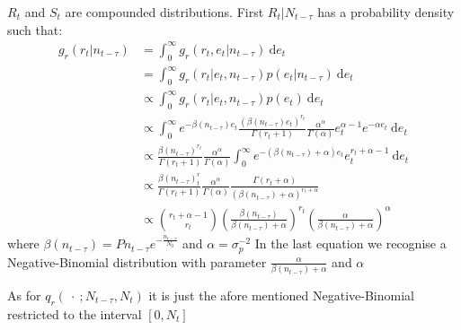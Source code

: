\documentclass{article}
\begin{document}
	$R_t$ and $S_t$ are compounded distributions.
	First $R_t | N_{t-\tau}$ has a probability density such that:
	\begin{equation*}
	\begin{split}
			g_r(r_t | n_{t-\tau}) & = \int_{0}^{\infty}g_r(r_t, e_t | n_{t-\tau})\ \mathrm{d}e_t \\
			& = \int_{0}^{\infty}g_r(r_t | e_t, n_{t-\tau})p(e_t | n_{t-\tau})\ \mathrm{d}e_t \\
			& \propto \int_{0}^{\infty}g_r(r_t | e_t, n_{t-\tau})p(e_t)\ \mathrm{d}e_t \\
			& \propto \int_{0}^{\infty}e^{-\beta(n_{t-\tau})e_t}\frac{(\beta(n_{t-\tau})e_t)^{r_t}}{\Gamma(r_t+1)}\frac{\alpha^\alpha}{\Gamma(\alpha)}e_t^{\alpha-1}e^{-\alpha e_t}\ \mathrm{d}e_t \\
			& \propto \frac{\beta(n_{t-\tau})^{r_t}}{\Gamma(r_t+1)}\frac{\alpha^\alpha}{\Gamma(\alpha)}\int_{0}^{\infty}e^{-(\beta(n_{t-\tau})+\alpha)e_t}e_t^{r_t+\alpha-1}\ \mathrm{d}e_t \\
			& \propto \frac{\beta(n_{t-\tau})^r_t}{\Gamma(r_t+1)}\frac{\alpha^\alpha}{\Gamma(\alpha)}\frac{\Gamma(r_t+\alpha)}{(\beta(n_{t-\tau})+\alpha)^{r_t+\alpha}} \\
			& \propto \binom{r_t + \alpha - 1}{r_t}(\frac{\beta(n_{t-\tau})}{\beta(n_{t-\tau}) + \alpha})^{r_t}(\frac{\alpha}{\beta(n_{t-\tau}) + \alpha})^\alpha
	\end{split}
	\end{equation*}
	where $\beta(n_{t-\tau}) = Pn_{t-\tau}e^{-\frac{n_{t-\tau}}{N_0}}$ and $\alpha = \sigma_p^{-2}$
	In the last equation we recognise a Negative-Binomial distribution with parameter $\frac{\alpha}{\beta(n_{t-\tau}) + \alpha}$ and $\alpha$
	
	As for $q_r(\ \cdot \ ; N_{t-\tau}, N_t)$ it is just the afore mentioned Negative-Binomial restricted to the interval $[0, N_t]$
	
\end{document}
